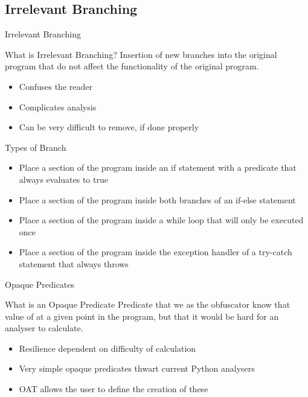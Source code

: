 \subsection{Irrelevant Branching}

\begin{frame}{Irrelevant Branching}
\begin{block}{What is Irrelevant Branching?}
Insertion of new branches into the original program that do not affect the functionality of the original program.
\end{block}
\begin{itemize}
\item Confuses the reader
\item Complicates analysis
\item Can be very difficult to remove, if done properly
\end{itemize}
\end{frame}

\begin{frame}{Types of Branch}
\begin{itemize}
\item Place a section of the program inside an if statement with a predicate that always evaluates to true
\item Place a section of the program inside both branches of an if-else statement
\item Place a section of the program inside a while loop that will only be executed once
\item Place a section of the program inside the exception handler of a try-catch statement that always throws
\end{itemize}
\end{frame}

\begin{frame}{Opaque Predicates}
\begin{block}{What is an Opaque Predicate}
Predicate that we as the obfuscator know that value of at a given point in the program, but that it would be hard for an analyser to calculate.
\end{block}
\begin{itemize}
\item Resilience dependent on difficulty of calculation
\item Very simple opaque predicates thwart current Python analysers
\item OAT allows the user to define the creation of these
\end{itemize}
\end{frame}

